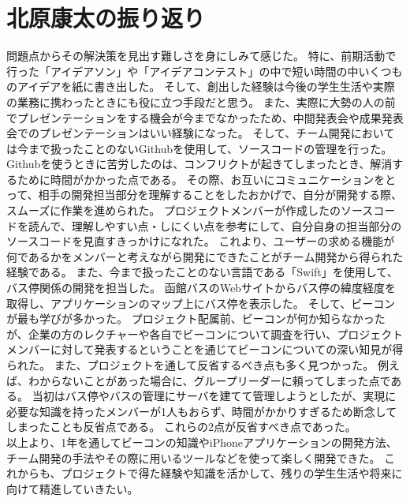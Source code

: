 \documentclass[openany,11pt,papersize]{jsbook}
\begin{document}

\section{北原康太の振り返り}
問題点からその解決策を見出す難しさを身にしみて感じた。
特に、前期活動で行った「アイデアソン」や「アイデアコンテスト」の中で短い時間の中いくつものアイデアを紙に書き出した。
そして、創出した経験は今後の学生生活や実際の業務に携わったときにも役に立つ手段だと思う。
また、実際に大勢の人の前でプレゼンテーションをする機会が今までなかったため、中間発表会や成果発表会でのプレゼンテーションはいい経験になった。 
そして、チーム開発においては今まで扱ったことのないGithubを使用して、ソースコードの管理を行った。
Githubを使うときに苦労したのは、コンフリクトが起きてしまったとき、解消するために時間がかかった点である。
その際、お互いにコミュニケーションをとって、相手の開発担当部分を理解することをしたおかげで、自分が開発する際、スムーズに作業を進められた。
プロジェクトメンバーが作成したのソースコードを読んで、理解しやすい点・しにくい点を参考にして、自分自身の担当部分のソースコードを見直すきっかけになれた。
これより、ユーザーの求める機能が何であるかをメンバーと考えながら開発にできたことがチーム開発から得られた経験である。
また、今まで扱ったことのない言語である「Swift」を使用して、バス停関係の開発を担当した。
函館バスのWebサイトからバス停の緯度経度を取得し、アプリケーションのマップ上にバス停を表示した。
そして、ビーコンが最も学びが多かった。
プロジェクト配属前、ビーコンが何か知らなかったが、企業の方のレクチャーや各自でビーコンについて調査を行い、プロジェクトメンバーに対して発表するということを通じてビーコンについての深い知見が得られた。
また、プロジェクトを通して反省するべき点も多く見つかった。
例えば、わからないことがあった場合に、グループリーダーに頼ってしまった点である。
当初はバス停やバスの管理にサーバを建てて管理しようとしたが、実現に必要な知識を持ったメンバーが1人もおらず、時間がかかりすぎるため断念してしまったことも反省点である。
これらの2点が反省すべき点であった。\\
以上より、1年を通してビーコンの知識やiPhoneアプリケーションの開発方法、チーム開発の手法やその際に用いるツールなどを使って楽しく開発できた。
これからも、プロジェクトで得た経験や知識を活かして、残りの学生生活や将来に向けて精進していきたい。

\end{document}
